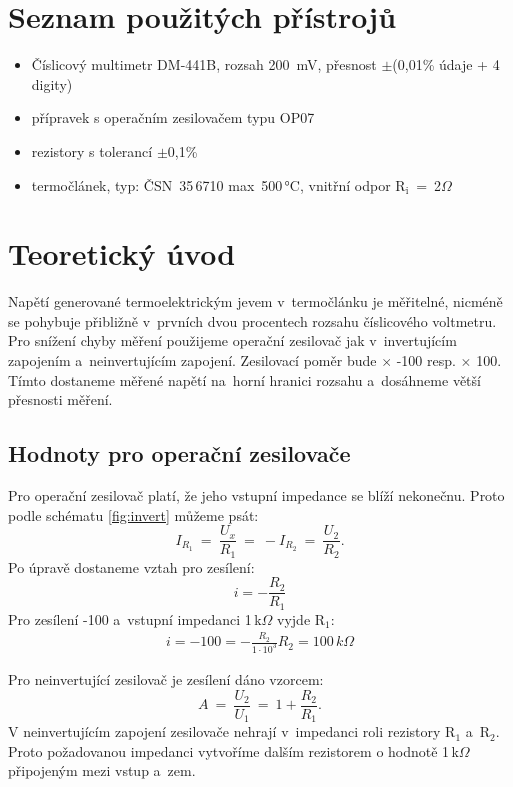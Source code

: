 \documentclass[a4paper,12pt]{article}   %
\newcommand{\sub}[1]{$_\textrm{#1}$}
\begin{document}
\section{Seznam použitých přístrojů}
\begin{itemize}
    \item Číslicový multimetr DM-441B, rozsah 200~mV, přesnost $\pm$(0,01\% údaje + 4 digity)
    \item přípravek s operačním zesilovačem typu OP07
    \item rezistory s tolerancí $\pm$0,1\%
    \item termočlánek, typ: ČSN~35\,6710 max~500\,°C, vnitřní odpor R\sub{i}~=~2$\Omega$
\end{itemize}

\section{Teoretický úvod}
Napětí generované termoelektrickým jevem v~termočlánku je měřitelné, nicméně se pohybuje přibližně v~prvních dvou procentech rozsahu číslicového voltmetru. Pro snížení chyby měření použijeme operační zesilovač jak v~invertujícím zapojením a~neinvertujícím zapojení. Zesilovací poměr bude $\times$ -100 resp. $\times$ 100. Tímto dostaneme měřené napětí na~horní hranici rozsahu a~dosáhneme větší přesnosti měření.

\subsection{Hodnoty pro operační zesilovače}
Pro operační zesilovač platí, že jeho vstupní impedance se blíží nekonečnu. Proto podle schématu \ref{fig:invert} můžeme psát:
\begin{equation*}
    I_{R_1}~=~\frac{U_x}{R_1}~=~-I_{R_2}~=~\frac{U_2}{R_2}.
\end{equation*}
Po úpravě dostaneme vztah pro zesílení:
\begin{equation*}
    i=-\frac{R_2}{R_1}
\end{equation*}
Pro zesílení -100 a~vstupní impedanci 1\,k$\Omega$ vyjde R\sub{1}:
\begin{equation*}
    \begin{split}
        i=-100=-\frac{R_2}{1\cdot10^3}
        R_2=100\,k\Omega
    \end{split}
\end{equation*}

Pro neinvertující zesilovač je zesílení dáno vzorcem:
\begin{equation*}
    A~=~\frac{U_2}{U_1}~=~1+\frac{R_2}{R_1}.
\end{equation*}
V neinvertujícím zapojení zesilovače nehrají v~impedanci roli rezistory R\sub{1} a~R\sub{2}. Proto požadovanou impedanci vytvoříme dalším rezistorem o hodnotě 1\,k$\Omega$ připojeným mezi vstup a~zem.
\end{document}
